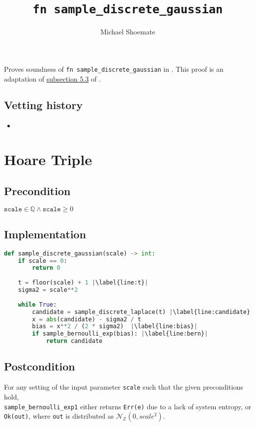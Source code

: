\documentclass{article}
\title{\texttt{fn sample\_discrete\_gaussian}}
\author{Michael Shoemate}
\begin{document}
\maketitle

\contrib
Proves soundness of \texttt{fn sample\_discrete\_gaussian} in .
This proof is an adaptation of \href{https://arxiv.org/pdf/2004.00010.pdf#subsection.5.3}{subsection 5.3} of \cite{CKS20}.

\subsection*{Vetting history}
\begin{itemize}
    \item {}
\end{itemize}

\section{Hoare Triple}
\subsection*{Precondition}
$\texttt{scale} \in \mathbb{Q} \land \texttt{scale} \geq 0$

\subsection*{Implementation}        
\begin{lstlisting}[language=Python, escapechar=|]
def sample_discrete_gaussian(scale) -> int:
    if scale == 0:
        return 0
    
    t = floor(scale) + 1 |\label{line:t}|
    sigma2 = scale**2
    
    while True:
        candidate = sample_discrete_laplace(t) |\label{line:candidate}|
        x = abs(candidate) - sigma2 / t
        bias = x**2 / (2 * sigma2)  |\label{line:bias}|
        if sample_bernoulli_exp(bias): |\label{line:bern}|
            return candidate
\end{lstlisting}

\subsection*{Postcondition}
\label{postcondition}
For any setting of the input parameter \texttt{scale} such that the given preconditions hold, \\
\texttt{sample\_bernoulli\_exp1} either returns \texttt{Err(e)} due to a lack of system entropy,
or \texttt{Ok(out)}, where \texttt{out} is distributed as $\mathcal{N}_\mathbb{Z}(0, scale^2)$.
\end{document}
